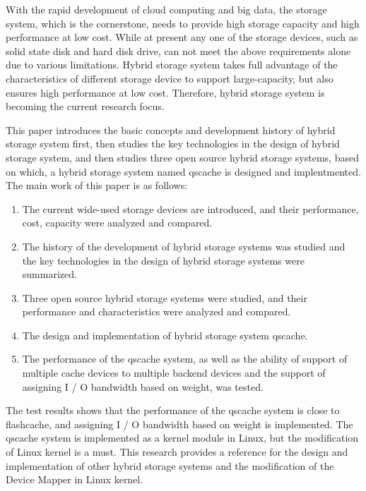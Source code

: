 \begin{englishabstract}

With the rapid development of cloud computing and big data, the storage system, which is the cornerstone, needs to provide high storage capacity and high performance at low cost. While at present any one of the storage devices, such as solid state disk and hard disk drive, can not meet the above requirements alone due to various limitations. Hybrid storage system takes full advantage of the characteristics of different storage device to support large-capacity, but also ensures high performance at low cost. Therefore, hybrid storage system is becoming the current research focus. 

This paper introduces the basic concepts and development history of hybrid storage system first, then studies the key technologies in the design of hybrid storage system, and then studies three open source hybrid storage systems, based on which, a hybrid storage system named qscache is designed and implentmented. The main work of this paper is as follows:

\begin{enumerate}
    \item The current wide-used storage devices are introduced, and their performance, cost, capacity were analyzed and compared.
    \item The history of the development of hybrid storage systems was studied and the key technologies in the design of hybrid storage systems were summarized.
    \item Three open source hybrid storage systems were studied, and their performance and characteristics were analyzed and compared.
    \item The design and implementation of hybrid storage system qscache.
    \item The performance of the qscache system, as well as the ability of support of multiple cache devices to multiple backend devices and the support of assigning I / O bandwidth based on weight, was tested.
\end{enumerate}

The test results shows that the performance of the qscache system is close to flashcache, and assigning I / O bandwidth based on weight is implemented. The qscache system is implemented as a kernel module in Linux, but the modification of Linux kernel is a must. This research provides a reference for the design and implementation of other hybrid storage systems and the modification of the Device Mapper in Linux kernel.

\end{englishabstract}

